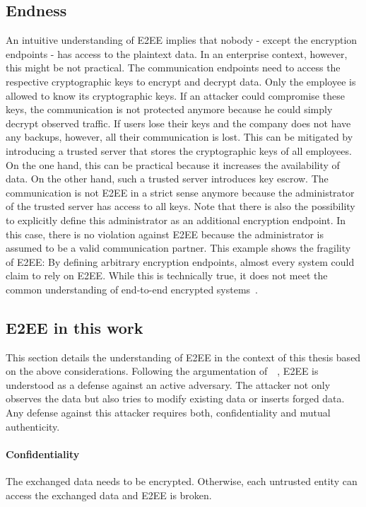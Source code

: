 \documentclass[../main.tex]{subfiles}
\begin{document}
\subsection{Endness}

An intuitive understanding of E2EE implies that nobody - except the encryption endpoints - has access to the plaintext data.
In an enterprise context, however, this might be not practical.
The communication endpoints need to access the respective cryptographic keys to encrypt and decrypt data.
Only the employee is allowed to know its cryptographic keys.
If an attacker could compromise these keys, the communication is not protected anymore because he could simply decrypt observed traffic.
If users lose their keys and the company does not have any backups, however, all their communication is lost.
This can be mitigated by introducing a trusted server that stores the cryptographic keys of all employees.
On the one hand, this can be practical because it increases the availability of data. 
On the other hand, such a trusted server introduces key escrow.
The communication is not E2EE in a strict sense anymore because the administrator of the trusted server has access to all keys.
Note that there is also the possibility to explicitly define this administrator as an additional encryption endpoint.
In this case, there is no violation against E2EE because the administrator is assumed to be a valid communication partner.
This example shows the fragility of E2EE:
By defining arbitrary encryption endpoints, almost every system could claim to rely on E2EE.
While this is technically true, it does not meet the common understanding of end-to-end encrypted systems~\cite{Hale2022,Nabeel2017,Mallory2022}.

\subsection{E2EE in this work}
This section details the understanding of E2EE in the context of this thesis based on the above considerations.
Following the argumentation of~\citeauthor{Hale2022}~\cite{Hale2022}, E2EE is understood as a defense against an active adversary.
The attacker not only observes the data but also tries to modify existing data or inserts forged data.
Any defense against this attacker requires both, confidentiality and mutual authenticity.
\paragraph{Confidentiality}
The exchanged data needs to be encrypted. 
Otherwise, each untrusted entity can access the exchanged data and E2EE is broken.
\end{document}

